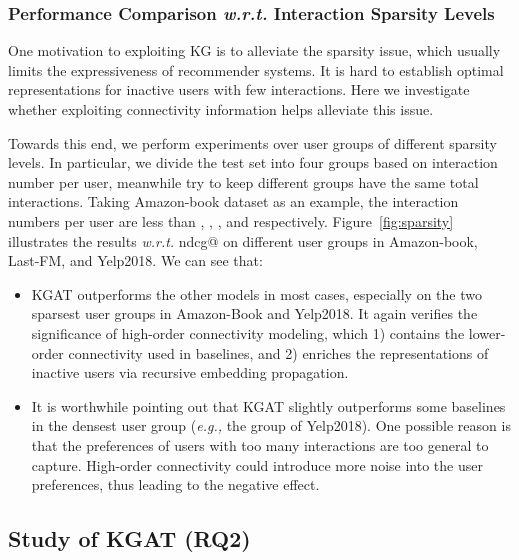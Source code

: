 \documentclass[sigconf]{acmart}
\newcommand{\eg}{\emph{e.g., }}
\newcommand{\wrt}{\emph{w.r.t. }}
\theoremstyle{definition}
\begin{document}
\subsubsection{\textbf{Performance Comparison \wrt Interaction Sparsity Levels}}\label{sec:sparsity}
One motivation to exploiting KG is to alleviate the sparsity issue, which usually limits the expressiveness of recommender systems.
It is hard to establish optimal representations for inactive users with few interactions.
Here we investigate whether exploiting connectivity information helps alleviate this issue.



Towards this end, we perform experiments over user groups of different sparsity levels.
In particular, we divide the test set into four groups based on interaction number per user, meanwhile try to keep different groups have the same total interactions.
Taking Amazon-book dataset as an example, the interaction numbers per user are less than , , , and  respectively.
Figure~\ref{fig:sparsity} illustrates the results \wrt ndcg@ on different user groups in Amazon-book, Last-FM, and Yelp2018.
We can see that:
\begin{itemize}[leftmargin=*]
    \item KGAT outperforms the other models in most cases, especially on the two sparsest user groups in Amazon-Book and Yelp2018.
    It again verifies the significance of high-order connectivity modeling, which 1) contains the lower-order connectivity used in baselines, and 2) enriches the representations of inactive users via recursive embedding propagation.
    
    




    \item It is worthwhile pointing out that KGAT slightly outperforms some baselines in the densest user group (\eg the  group of Yelp2018). One possible reason is that the preferences of users with too many interactions are too general to capture. High-order connectivity could introduce more noise into the user preferences, thus leading to the negative effect.
\end{itemize}


\subsection{Study of KGAT (RQ2)}
\end{document}
